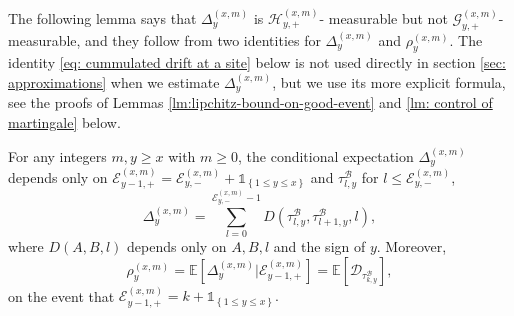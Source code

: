 \documentclass[EJP]{ejpecp} %
\begin{document}
The following lemma says that $\Delta^{(x,m)}_{y}$ is $\mathcal{H}_{y, +}^{(x,m)}$- measurable but not $\mathcal{G}_{y, +}^{(x,m)}$- measurable, and they follow from two identities for $\Delta^{(x,m)}_{y}$ and $\rho_{y}^{(x,m)}$. The identity \eqref{eq: cummulated drift at a site} below is not used directly in section \ref{sec: approximations} when we estimate $\Delta^{(x,m)}_{y}$, but we use its more explicit formula, see the proofs of Lemmas \ref{lm:lipchitz-bound-on-good-event} and \ref{lm: control of martingale} below.
\begin{lemma}\label{lm: identities for Del, rho} 
	For any integers $m,y\geq x$ with $m\geq 0$, the conditional expectation $\Delta^{(x,m)}_{y}$ depends only on $ \mathcal{E}_{y-1,+}^{(x,m)} = \mathcal{E}_{y,-}^{(x,m)} + \mathbb{1}_{ \left\{ 1\leq y \leq x \right\} }$ and $ \tau^{\mathcal{B}}_{l,y}$ for $l\leq \mathcal{E}^{(x,m)}_{y,-} $,
	\begin{equation} \label{eq: cummulated drift at a site}
		\Delta_{y}^{(x,m)} = \sum_{l=0 }^{ \mathcal{E}^{(x,m)}_{y,-} -1  } D\left(\tau^{\mathcal{B}}_{l,y},\tau^{\mathcal{B}}_{l+1,y},l \right),
	\end{equation}	
	where $D(A,B,l)$ depends only on $A,B,l$ and the sign of $y$.
	Moreover, 
	\begin{equation} \label{eq: conditional mean in GPU represenetation}
		\rho_{y}^{(x,m)} = \mathbb{E}\left[ \Delta_{y}^{(x,m)}\vert \mathcal{E}^{(x,m)}_{y-1,+} \right]	  
		= \mathbb{E}\left[  \mathcal{D}_{\tau^{\mathcal{B}}_{k,y}} \right],
	\end{equation} 
	on the event that $\mathcal{E}^{(x,m)}_{y-1,+}  = k + \mathbb{1}_{\left\{1\leq y\leq x\right\}}.$
\end{lemma}
\end{document}
